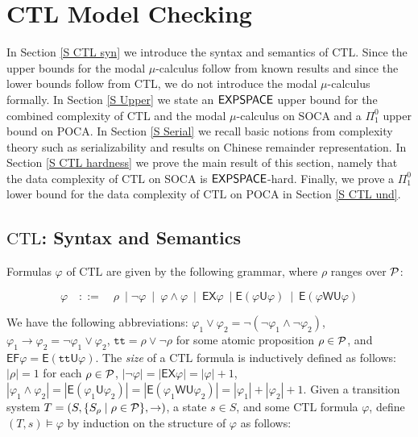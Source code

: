 \documentclass[times,envcountsame]{llncs}
\def\CTL{{\text{CTL}}}
\def\EF{{\mathsf{EF}}}
\def\U{{\mathsf{U}}}
\def\WU{{\mathsf{WU}}}
\def\EX{{\mathsf{EX}}}
\def\E{{\mathsf{E}}}
\newcommand{\prop}{\rho}
\newcommand{\ctl}{\text{CTL}}
\newcommand{\true}{\ensuremath{\mathtt{tt}}}
\begin{document}
\section{CTL Model Checking}{\label{S CTL}}

In Section \ref{S CTL syn} we introduce the syntax and semantics of $\ctl$.
Since the upper bounds for the modal $\mu$-calculus follow from
known results and since the lower bounds follow from CTL, we do not introduce
the modal $\mu$-calculus formally.
In Section \ref{S Upper} we state an ${\mathsf{EXPSPACE}}$ upper bound for the combined
complexity of $\ctl$ and the modal $\mu$-calculus on SOCA and a $\Pi^0_1$ upper bound
on POCA. In Section \ref{S Serial} we recall basic notions from complexity theory
such as serializability and results on Chinese remainder representation.
In Section \ref{S CTL hardness} we prove the main result of this section, namely
that the data complexity of $\ctl$ on SOCA is ${\mathsf{EXPSPACE}}$-hard.
Finally, we prove a $\Pi^0_1$ lower bound for the data complexity
of $\ctl$ on POCA in Section \ref{S CTL und}.

\subsection{$\ctl$: Syntax and Semantics}{\label{S CTL syn}}
\noindent
Formulas $\varphi$ of $\ctl$ are given by the following
grammar, where $\prop$ ranges over $\mathcal{P}$:

$$
\varphi\quad ::=\quad \prop\ \mid \neg\varphi\ \mid\ \varphi\wedge\varphi\ \mid\
\EX\varphi\ \mid \E (\varphi\U\varphi)\ \mid\
\E(\varphi\WU\varphi)
$$

\noindent
We have the following abbreviations:
$\varphi_1\vee\varphi_2=\neg(\neg\varphi_1\wedge\neg\varphi_2)$,
$\varphi_1\rightarrow\varphi_2=\neg\varphi_1\vee\varphi_2$,
$\true=\prop\vee\neg\prop$ for some atomic proposition $\prop\in\Prop$,
and $\EF\varphi=\E(\true\U\varphi)$.
The {\em size} of a $\ctl$ formula is inductively defined as follows:
$|\prop|=1$ for each $\prop\in\Prop$, $|\neg\varphi|=|\EX\varphi|=|\varphi|+1$,
$|\varphi_1\wedge\varphi_2|=|\E(\varphi_1\U\varphi_2)|=|\E(\varphi_1\WU\varphi_2)|=
|\varphi_1|+|\varphi_2|+1$.
Given a transition system $T=(S,\{S_\prop\mid \prop\in\Prop\},\rightarrow)$, a state
$s\in S$, and some $\CTL$ formula $\varphi$, define $(T,s)\models\varphi$ by
induction on the structure of $\varphi$ as follows:
\end{document}
